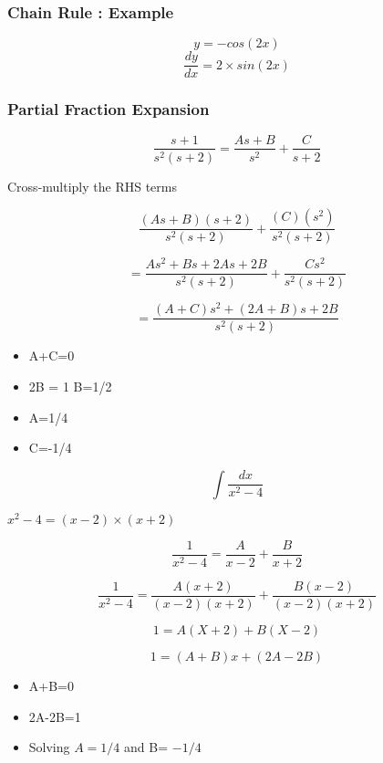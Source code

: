 \documentclass{beamer}
\begin{document}
			\begin{frame}
		\frametitle{Chain Rule : Example}
		\[ y= -cos(2x) \]
		\[ \frac{dy}{dx}= 2\times sin(2x) \]
		
			\end{frame}
			\begin{frame}
		\frametitle{Partial Fraction Expansion}
		
		\[ \frac{s+1}{s^2(s+2)} = \frac{As+B}{s^2} + \frac{C}{s+2}\]
		
		Cross-multiply the RHS terms
		
		
		\[ \frac{(As+B)(s+2)}{s^2(s+2)} + \frac{(C)(s^2)}{s^2(s+2)} \]
		
		
		\[  = \frac{As^2+Bs +2As +2B}{s^2(s+2)} + \frac{Cs^2}{s^2(s+2)} \]
		
		
		\[  = \frac{(A+C)s^2+(2A+B)s +2B}{s^2(s+2)} \]
		
		\begin{itemize}\item A+C=0
			\item 2B = 1 B=1/2
			\item A=1/4
			\item C=-1/4
		\end{itemize}
		
		
			\end{frame}
			\begin{frame}
		\[ \int \frac{dx}{x^2-4} \]
		
		$x^2-4 = (x-2)\times(x+2)$
		
		\[ \frac{1}{x^2-4} = \frac{A}{x-2} + \frac{B}{x+2}  \]
		
		\[ \frac{1}{x^2-4} = \frac{A(x+2)}{(x-2)(x+2)} + \frac{B(x-2)}{(x-2)(x+2)}  \]
		
		\[ 1 = A(X+2) +  B(X-2)  \]
		
		\[ 1 = (A+B)x +  (2A-2B)  \]
			\end{frame}
			\begin{frame}
		\begin{itemize} \item A+B=0
			\item 2A-2B=1
			\item Solving $A=1/4$ and B= $-1/4$
		\end{itemize}
			\end{frame}
\end{document}
